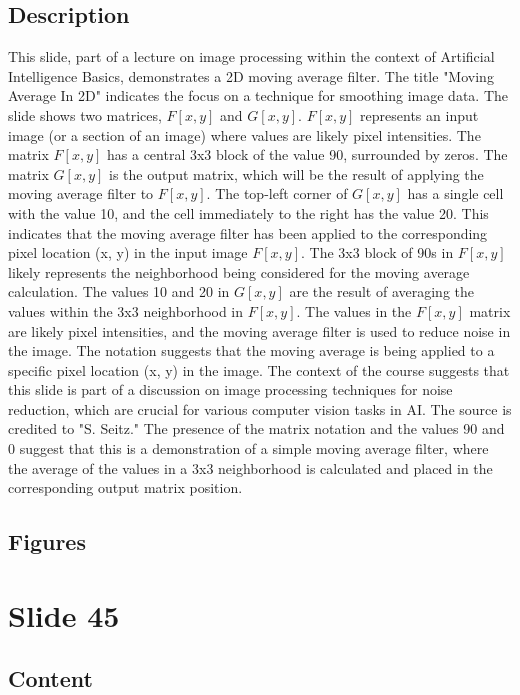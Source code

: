 \documentclass{article}%
\begin{document}
\subsection{Description}%
This slide, part of a lecture on image processing within the context of Artificial Intelligence Basics, demonstrates a 2D moving average filter.  The title "Moving Average In 2D" indicates the focus on a technique for smoothing image data.  The slide shows two matrices, $F[x, y]$ and $G[x, y]$.  $F[x, y]$ represents an input image (or a section of an image) where values are likely pixel intensities.  The matrix $F[x, y]$ has a central 3x3 block of the value 90, surrounded by zeros.  The matrix $G[x, y]$ is the output matrix, which will be the result of applying the moving average filter to $F[x, y]$.  The top-left corner of $G[x, y]$ has a single cell with the value 10, and the cell immediately to the right has the value 20. This indicates that the moving average filter has been applied to the corresponding pixel location (x, y) in the input image $F[x, y]$. The 3x3 block of 90s in $F[x, y]$ likely represents the neighborhood being considered for the moving average calculation. The values 10 and 20 in $G[x, y]$ are the result of averaging the values within the 3x3 neighborhood in $F[x, y]$. The values in the $F[x, y]$ matrix are likely pixel intensities, and the moving average filter is used to reduce noise in the image. The notation suggests that the moving average is being applied to a specific pixel location (x, y) in the image. The context of the course suggests that this slide is part of a discussion on image processing techniques for noise reduction, which are crucial for various computer vision tasks in AI.  The source is credited to "S. Seitz."  The presence of the matrix notation and the values 90 and 0 suggest that this is a demonstration of a simple moving average filter, where the average of the values in a 3x3 neighborhood is calculated and placed in the corresponding output matrix position.%
\subsection{Figures}%
\begin{figure}[H]%
\centering%
\end{figure}

%
\newpage%
\section{Slide 45}%
\label{sec:Slide45}%
\subsection{Content}%
%
\end{document}
